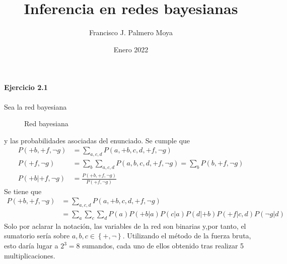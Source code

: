 \documentclass[12pt,a4paper]{article}
\title{Inferencia en redes bayesianas}
\author{Francisco J. Palmero Moya}
\date{Enero 2022}
\begin{document}
\renewcommand{\tablename}{Tabla}

\maketitle

\paragraph*{Ejercicio 2.1}
Sea la red bayesiana

\begin{figure}[h!]
    \centering
    \caption{Red bayesiana}\label{fig:red}
\end{figure}
y las probabilidades asociadas del enunciado. Se cumple que 
\begin{align}
    P(+b , +f, \neg g) & = \sum_{a, c, d} P(a, +b, c, d, +f, \neg g) \\
    P(+f, \neg g) & = \sum_{b} \sum_{a, c, d} P(a, b, c, d, +f, \neg g) = \sum_{b} P(b , +f, \neg g) \\
    P(+b | +f, \neg g) & = \frac{P(+b , +f, \neg g)}{P(+f, \neg g)} \label{eq:f}
\end{align}
Se tiene que
\begin{align}\label{eq:fac}
    P(+b , +f, \neg g) & = \sum_{a, c, d} P(a, +b, c, d, +f, \neg g) \\
    & = \sum_{a} \sum_{c} \sum_{d} P(a) P(+b | a) P(c | a) P(d | +b) P(+f | c, d) P(\neg g | d)
\end{align}
Solo por aclarar la notación, las variables de la red son binarias y,por tanto, el sumatorio sería sobre $a, b, c \in \left\{+, \neg \right\}$. Utilizando el método de la fuerza bruta, esto daría lugar a $2^3 = 8$ sumandos, cada uno de ellos obtenido tras realizar 5 multiplicaciones.\\
\end{document}
